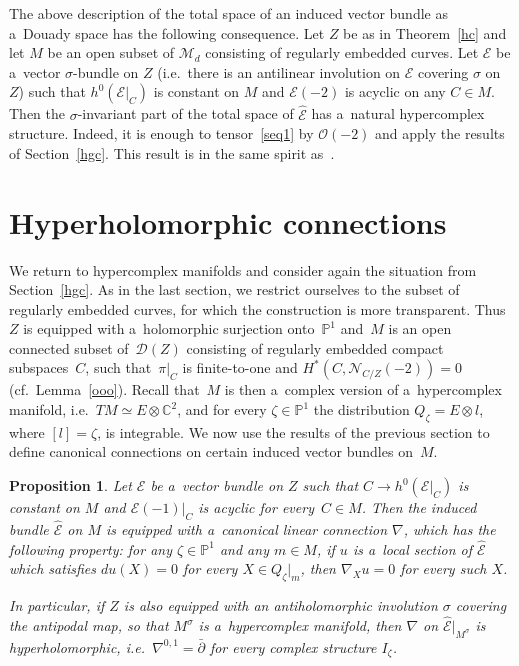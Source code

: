 \documentclass[pdftex]{sigma}
\numberwithin{equation}{section}
\newtheorem{Proposition}[Theorem]{Proposition}
{\theoremstyle{definition}
\newtheorem{Definition}[Theorem]{Definition}
\newtheorem{Remark}[Theorem]{Remark}
}
\begin{document}
\begin{Remark}
The above description of the total space of an induced vector bundle as a~Douady space has the following consequence.
Let $Z$ be as in Theorem~\ref{hc} and let $M$ be an open subset of ${\mathcal{M}}_d$ consisting of regularly embedded
curves.
Let ${\mathcal{E}}$ be a~vector $\sigma$-bundle on $Z$ (i.e.\
there is an antilinear involution on ${\mathcal{E}}$ covering $\sigma$ on $Z$) such that $h^0({\mathcal{E}}|_C)$ is
constant on $M$ and ${\mathcal{E}}(-2)$ is acyclic on any $C\in M$.
Then the $\sigma$-invariant part of the total space of $\widehat {\mathcal{E}}$ has a~natural hypercomplex structure.
Indeed, it is enough to tensor~\eqref{seq1} by ${\mathcal{O}}(-2)$ and apply the results of Section~\ref{hgc}.
This result is in the same spirit as~\cite[Theorem~7.2]{Sal}.
\end{Remark}

\section{Hyperholomorphic connections}

We return to hypercomplex manifolds and consider again the situation from Section~\ref{hgc}.
As in the last section, we restrict ourselves to the subset of regularly embedded curves, for which the construction is
more transparent.
Thus~$Z$ is equipped with a~holomorphic surjection onto~${\mathbb{P}}^1$ and~$M$ is an open connected subset of~${\mathcal{D}}(Z)$ consisting of regularly embedded compact subspaces~$C$, such that~$\pi|_C$ is f\/inite-to-one and
$H^\ast (C,{\mathcal{N}}_{C/Z}(-2))=0$ (cf.\
Lemma~\ref{ooo}).
Recall that~$M$ is then a~complex version of a~hypercomplex manifold, i.e.\
$TM\simeq E\otimes {\mathbb{C}}^2$, and for every $\zeta\in {\mathbb{P}}^1$ the distribution $Q_\zeta=E\otimes l$, where
$[l]=\zeta$, is integrable.
We now use the results of the previous section to def\/ine canonical connections on certain induced vector bundles on~$M$.

\begin{Proposition}
Let ${\mathcal{E}}$ be a~vector bundle on $Z$ such that $C\to h^0({\mathcal{E}}|_C)$ is constant on $M$ and
${\mathcal{E}}(-1)|_{C}$ is acyclic for every~$C\in M$.
Then the induced bundle $\widehat{{\mathcal{E}}}$ on $M$ is equipped with a~canonical linear connection $\nabla$, which
has the following property: for any $\zeta\in {\mathbb{P}}^1$ and any $m\in M$, if $u$ is a~local section of
$\widehat{{\mathcal{E}}}$ which satisfies $du(X)=0$ for every $X\in Q_\zeta|_m$, then $\nabla_X u=0$ for every such $X$.

In particular, if $Z$ is also equipped with an antiholomorphic involution $\sigma$ covering the antipodal map, so that
$M^\sigma$ is a~hypercomplex manifold, then $\nabla$ on $\widehat{{\mathcal{E}}}|_{M^\sigma}$ is hyperholomorphic, i.e.\
$\nabla^{0,1}=\bar{\partial}$ for every complex structure $I_\zeta$.
\end{Proposition}
\end{document}
